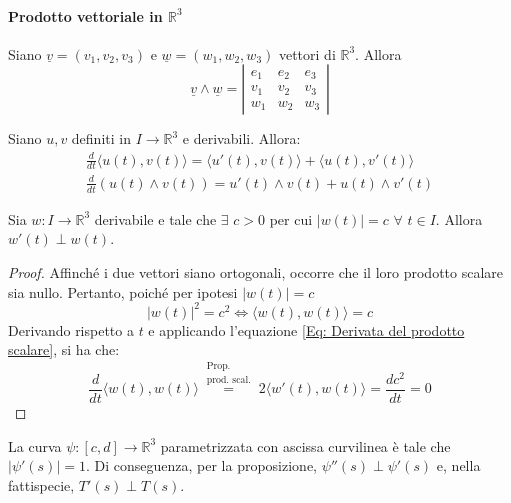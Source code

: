 \paragraph{Prodotto vettoriale in $\mathbb{R}^3$}
Siano $\underline{v}=(v_1, v_2, v_3)$ e $\underline{w}=(w_1, w_2, w_3)$ vettori di $\mathbb{R}^3$. Allora
\begin{equation*}
    \underline{v} \wedge \underline{w}=
    \left\lvert\begin{matrix}
         e_1 & e_2 & e_3 \\
               v_1 & v_2 & v_3 \\
               w_1 & w_2 & w_3
            \end{matrix}\right\rvert
\end{equation*}
\begin{lemma}
    Siano $u, v$ definiti in $I\to\mathbb{R}^3$ e derivabili. Allora:
    \begin{align}
        \frac{d}{dt}{\langle u(t), v(t) \rangle} = \langle u'(t), v(t) \rangle + \langle u(t), v'(t) \rangle \label{Eq: Derivata del prodotto scalare}\\
        \frac{d}{dt}\left(u(t) \wedge v(t)\right) = u'(t) \wedge v(t) + u(t) \wedge v'(t) \label{Eq: Derivata del prodotto vettoriale}
    \end{align}
\end{lemma}
\begin{proposition}
    Sia $w:I\to\mathbb{R}^3$ derivabile e tale che $\exists$ $c>0$ per cui $|w(t)|=c$ $\forall$ $t \in I$. Allora $w'(t) \perp w(t)$.
\end{proposition}
    \begin{proof}
        Affinché i due vettori siano ortogonali, occorre che il loro prodotto scalare sia nullo. Pertanto, poiché per ipotesi $|w(t)|=c$
        \begin{equation*}
            |w(t)|^2=c^2 \iff \langle w(t), w(t) \rangle = c
        \end{equation*}
        Derivando rispetto a $t$ e applicando l'equazione \eqref{Eq: Derivata del prodotto scalare}, si ha che:
        \begin{equation*}
            \frac{d}{dt}{\langle w(t), w(t)\rangle}\overset{\substack{\text{Prop.} \\ \text{prod. scal.} }}{=}2 \langle w'(t), w(t) \rangle = \frac{d c^2}{dt}=0
        \end{equation*}
    \end{proof}
\begin{oss}
    La curva $\psi:[c,d] \to \mathbb{R}^3$ parametrizzata con ascissa curvilinea è tale che $|\psi'(s)|=1$. Di conseguenza, per la proposizione, $\psi''(s) \perp \psi'(s)$ e, nella fattispecie, $T'(s) \perp T (s)$.  
\end{oss}
